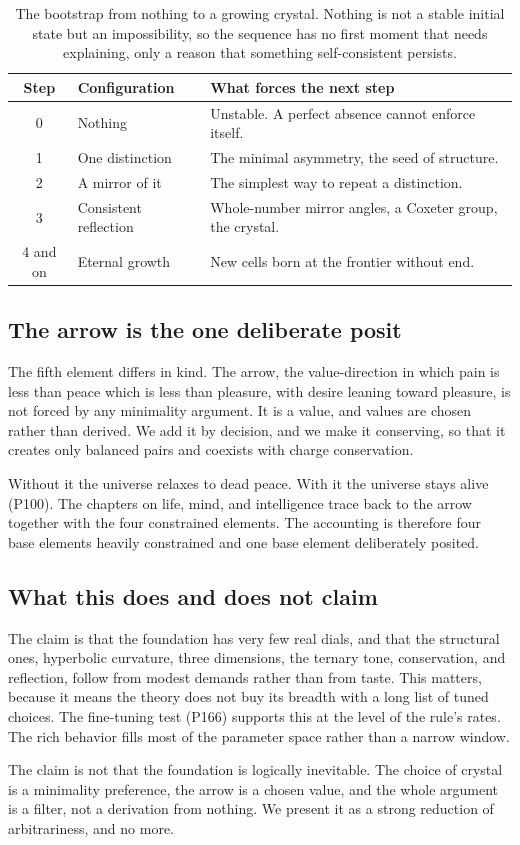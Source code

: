 \begin{table}[h]
\centering
\begin{tabular}{cll}
\toprule
Step & Configuration & What forces the next step \\
\midrule
0 & Nothing & Unstable. A perfect absence cannot enforce itself. \\
1 & One distinction & The minimal asymmetry, the seed of structure. \\
2 & A mirror of it & The simplest way to repeat a distinction. \\
3 & Consistent reflection & Whole-number mirror angles, a Coxeter group, the crystal. \\
4 and on & Eternal growth & New cells born at the frontier without end. \\
\bottomrule
\end{tabular}
\caption{The bootstrap from nothing to a growing crystal. Nothing is not a stable initial state but an impossibility, so the sequence has no first moment that needs explaining, only a reason that something self-consistent persists.}
\label{tab:bootstrap}
\end{table}

\subsection{The arrow is the one deliberate posit}

The fifth element differs in kind. The arrow, the value-direction in which pain is less than peace which is less than pleasure, with desire leaning toward pleasure, is not forced by any minimality argument. It is a value, and values are chosen rather than derived. We add it by decision, and we make it conserving, so that it creates only balanced pairs and coexists with charge conservation.

Without it the universe relaxes to dead peace. With it the universe stays alive (P100). The chapters on life, mind, and intelligence trace back to the arrow together with the four constrained elements. The accounting is therefore four base elements heavily constrained and one base element deliberately posited.

\subsection{What this does and does not claim}

The claim is that the foundation has very few real dials, and that the structural ones, hyperbolic curvature, three dimensions, the ternary tone, conservation, and reflection, follow from modest demands rather than from taste. This matters, because it means the theory does not buy its breadth with a long list of tuned choices. The fine-tuning test (P166) supports this at the level of the rule's rates. The rich behavior fills most of the parameter space rather than a narrow window.

The claim is not that the foundation is logically inevitable. The choice of crystal is a minimality preference, the arrow is a chosen value, and the whole argument is a filter, not a derivation from nothing. We present it as a strong reduction of arbitrariness, and no more.
